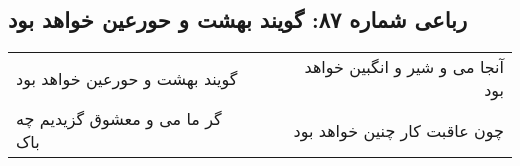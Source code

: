 \begin{center}
\section*{رباعی شماره ۸۷: گویند بهشت و حورعین خواهد بود}
\label{sec:sh087}
\begin{longtable}{l p{0.5cm} r}
گویند بهشت و حورعین خواهد بود
&&
آنجا می و شیر و انگبین خواهد بود
\\
گر ما می و معشوق گزیدیم چه باک
&&
چون عاقبت کار چنین خواهد بود
\\
\end{longtable}
\end{center}
